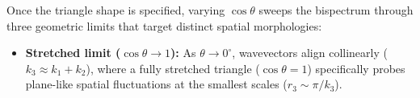 \documentclass[apj,twocolumn, appendixfloats, twocolappendix, numberedappendix, tighten]{openjournal}
\begin{document}
Once the triangle shape is specified, varying $\cos\theta$ sweeps the bispectrum through three geometric limits that target distinct spatial morphologies:


\begin{itemize}
    \item \textbf{Stretched limit ($\cos\theta \to 1$):} As $\theta \to 0^\circ$, wavevectors align collinearly ($k_3 \approx k_1 + k_2$), where a fully stretched triangle ($\cos\theta = 1$) specifically probes plane-like spatial fluctuations at the smallest scales ($r_3 \sim \pi/k_3$). %



\end{itemize}
\end{document}
